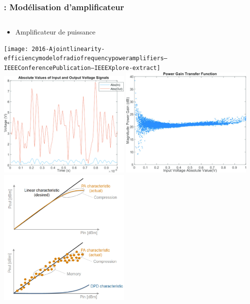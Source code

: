 \documentclass[aspectratio=169]{beamer}
\begin{document}
\begin{frame}
  \frametitle{\insertsection : Modélisation d'amplificateur}
  \vspace{-0.5\baselineskip}
  \begin{columns}[T]
    \begin{column}{0.5\textwidth}
      \begin{itemize}
        \item Amplificateur de puissance
      \end{itemize}
      \texttt{[image: 2016-Ajointlinearity-efficiencymodelofradiofrequencypoweramplifiers--IEEEConferencePublication--IEEEXplore-extract]}
      \includegraphics[width=0.49\textwidth]{modelling-rf-power-amplifiers-with-dpd-using-matlab-white-paper-extract-5}
      \includegraphics[width=0.49\textwidth]{modelling-rf-power-amplifiers-with-dpd-using-matlab-white-paper-extract-6}
      \includegraphics[width=0.49\textwidth]{modelling-rf-power-amplifiers-with-dpd-using-matlab-white-paper-extract-pic-002}

\end{column}
\end{columns}
\end{frame}
\end{document}
